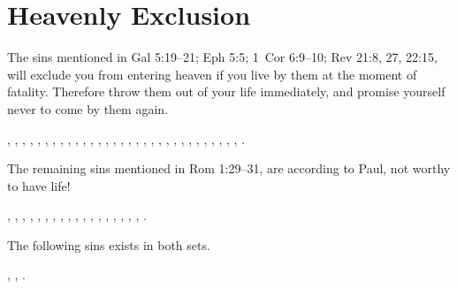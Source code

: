 \section{Heavenly Exclusion}

The sins mentioned in Gal 5:19--21; Eph 5:5; 1~Cor 6:9--10; Rev 21:8, 27, 22:15, will exclude you from entering heaven if you live by them at the moment of fatality. Therefore throw them out of your life immediately, and promise yourself never to come by them again.

,
,
,
,
,
,
,
,
,
,
,
,
,
,
,
,
,
,
,
,
,
,
,
,
,
,
,
,
,
,
,
.

The remaining sins mentioned in Rom 1:29--31, are according to Paul, not worthy to have life!

, 
, 
, 
, 
, 
, 
, 
, 
, 
, 
, 
, 
, 
, 
, 
, 
, 
, 
.

The following sins exists in both sets.

, %
, %
. %

